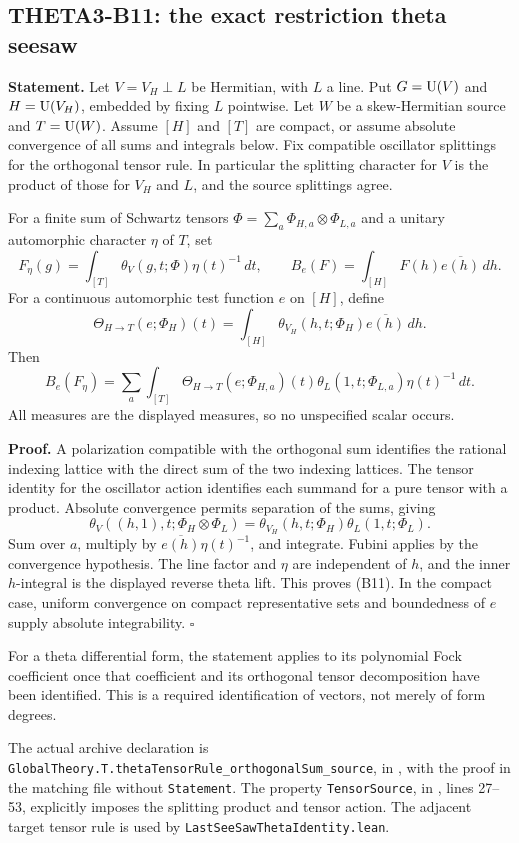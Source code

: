 \documentclass[11pt]{article}
\theoremstyle{definition}\newtheorem{definition}[theorem]{Definition}\newtheorem{remark}[theorem]{Remark}
\begin{document}
\subsection{THETA3-B11: the exact restriction theta seesaw}\label{B11}

\textbf{Statement.} Let $V=V_H\perp L$ be Hermitian, with $L$ a line. Put $G=\operatorname{U}(V)$ and $H=\operatorname{U}(V_H)$, embedded by fixing $L$ pointwise. Let $W$ be a skew-Hermitian source and $T=\operatorname{U}(W)$. Assume $[H]$ and $[T]$ are compact, or assume absolute convergence of all sums and integrals below. Fix compatible oscillator splittings for the orthogonal tensor rule. In particular the splitting character for $V$ is the product of those for $V_H$ and $L$, and the source splittings agree.

For a finite sum of Schwartz tensors
$\Phi=\sum_a\Phi_{H,a}\otimes\Phi_{L,a}$ and a unitary automorphic character $\eta$ of $T$, set
\[
 F_\eta(g)=\int_{[T]}\theta_V(g,t;\Phi)\eta(t)^{-1}\,dt,
 \qquad
 B_e(F)=\int_{[H]}F(h)\overline{e(h)}\,dh.
\]
For a continuous automorphic test function $e$ on $[H]$, define
\[
 \Theta_{H\to T}(e;\Phi_H)(t)=
 \int_{[H]}\theta_{V_H}(h,t;\Phi_H)\overline{e(h)}\,dh.
\]
Then
\[
 B_e(F_\eta)=\sum_a\int_{[T]}
 \Theta_{H\to T}(e;\Phi_{H,a})(t)
 \theta_L(1,t;\Phi_{L,a})\eta(t)^{-1}\,dt.
 \tag{B11}
\]
All measures are the displayed measures, so no unspecified scalar occurs.

\textbf{Proof.} A polarization compatible with the orthogonal sum identifies the rational indexing lattice with the direct sum of the two indexing lattices. The tensor identity for the oscillator action identifies each summand for a pure tensor with a product. Absolute convergence permits separation of the sums, giving
\[
 \theta_V((h,1),t;\Phi_H\otimes\Phi_L)
       =\theta_{V_H}(h,t;\Phi_H)\theta_L(1,t;\Phi_L).
\]
Sum over $a$, multiply by $\overline{e(h)}\eta(t)^{-1}$, and integrate. Fubini applies by the convergence hypothesis. The line factor and $\eta$ are independent of $h$, and the inner $h$-integral is the displayed reverse theta lift. This proves (B11). In the compact case, uniform convergence on compact representative sets and boundedness of $e$ supply absolute integrability. \hfill$\square$

For a theta differential form, the statement applies to its polynomial Fock coefficient once that coefficient and its orthogonal tensor decomposition have been identified. This is a required identification of vectors, not merely of form degrees.

The actual archive declaration is
\nolinkurl{GlobalTheory.T.thetaTensorRule_orthogonalSum_source}, in
, with the proof in the matching file without \texttt{Statement}. The property \texttt{TensorSource}, in , lines 27--53, explicitly imposes the splitting product and tensor action. The adjacent target tensor rule is used by \nolinkurl{LastSeeSawThetaIdentity.lean}.
\end{document}
